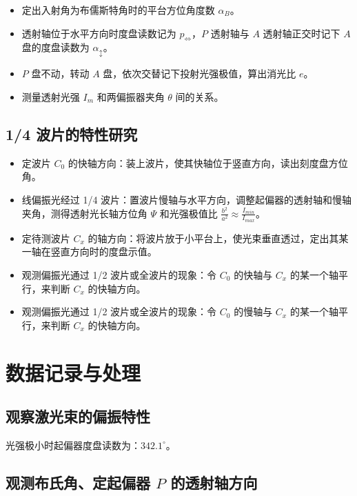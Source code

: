 \documentclass[a4paper]{article}
\begin{document}
\begin{itemize}
    \item 定出入射角为布儒斯特角时的平台方位角度数 $\alpha_B$。
    \item 透射轴位于水平方向时度盘读数记为 $p_{\Leftrightarrow}$，$P$ 透射轴与 $A$ 透射轴正交时记下 $A$ 盘的度盘读数为 $\alpha_{\updownarrow}$。
    \item $P$ 盘不动，转动 $A$ 盘，依次交替记下投射光强极值，算出消光比 $e$。
    \item 测量透射光强 $I_m$ 和两偏振器夹角 $\theta$ 间的关系。
\end{itemize}

\subsection{1/4 波片的特性研究}

\begin{itemize}
    \item 定波片 $C_0$ 的快轴方向：装上波片，使其快轴位于竖直方向，读出刻度盘方位角。
    \item 线偏振光经过 1/4 波片：置波片慢轴与水平方向，调整起偏器的透射轴和慢轴夹角，测得透射光长轴方位角 $\Psi$ 和光强极值比 $\frac{b^2}{a^2}\approx \frac{I_{min}}{I_{max}}$。
    \item 定待测波片 $C_x$ 的轴方向：将波片放于小平台上，使光束垂直透过，定出其某一轴在竖直方向时的度盘示值。
    \item 观测偏振光通过 1/2 波片或全波片的现象：令 $C_0$ 的快轴与 $C_x$ 的某一个轴平行，来判断 $C_x$ 的快轴方向。
    \item 观测偏振光通过 1/2 波片或全波片的现象：令 $C_0$ 的慢轴与 $C_x$ 的某一个轴平行，来判断 $C_x$ 的快轴方向。
\end{itemize}

\section{数据记录与处理}

\subsection{观察激光束的偏振特性}

\par 光强极小时起偏器度盘读数为：$342.1^\circ$。

\subsection{观测布氏角、定起偏器 $P$ 的透射轴方向}
\end{document}
